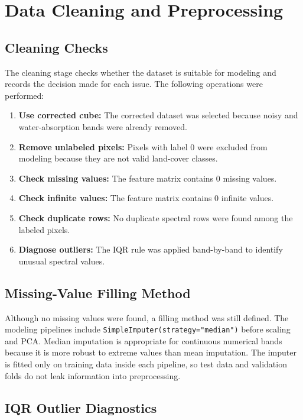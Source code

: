 \documentclass[12pt,a4paper]{article}
\begin{document}
\section{Data Cleaning and Preprocessing}

\subsection{Cleaning Checks}

The cleaning stage checks whether the dataset is suitable for modeling and records the decision made for each issue. The following operations were performed:

\begin{enumerate}
    \item \textbf{Use corrected cube:} The corrected dataset was selected because noisy and water-absorption bands were already removed.
    \item \textbf{Remove unlabeled pixels:} Pixels with label 0 were excluded from modeling because they are not valid land-cover classes.
    \item \textbf{Check missing values:} The feature matrix contains 0 missing values.
    \item \textbf{Check infinite values:} The feature matrix contains 0 infinite values.
    \item \textbf{Check duplicate rows:} No duplicate spectral rows were found among the labeled pixels.
    \item \textbf{Diagnose outliers:} The IQR rule was applied band-by-band to identify unusual spectral values.
\end{enumerate}

\subsection{Missing-Value Filling Method}

Although no missing values were found, a filling method was still defined. The modeling pipelines include \texttt{SimpleImputer(strategy="median")} before scaling and PCA. Median imputation is appropriate for continuous numerical bands because it is more robust to extreme values than mean imputation. The imputer is fitted only on training data inside each pipeline, so test data and validation folds do not leak information into preprocessing.

\subsection{IQR Outlier Diagnostics}
\end{document}
